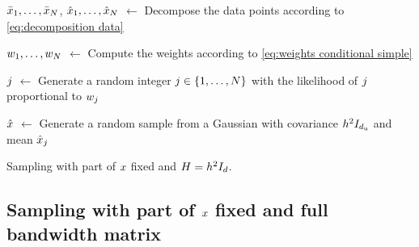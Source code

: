 \begin{algorithm}[t]
	
	$\bar{x}_{1},\ldots,\bar{x}_{N}$, $\hat{x}_{1},\ldots,\hat{x}_{N}$ $\gets$ Decompose the data points according to \cref{eq:decomposition data}
	
	$w_{1},\ldots,w_{N}$ $\gets$ Compute the weights according to \cref{eq:weights conditional simple}
	
	$j$ $\gets$ Generate a random integer $j\in\{1,\ldots,N\}$ with the likelihood of $j$ proportional to $w_{j}$
	
	$\hat{x}$ $\gets$ Generate a random sample from a Gaussian with covariance $h^2 I_{d_\mathrm{u}}$ and mean $\hat{x}_{j}$
		
	\caption{Sampling with part of $x$ fixed and $H=h^2 I_{d}$.}
	\label{alg:conditional simple}
\end{algorithm}



\subsection{Sampling with part of $x$ fixed and full bandwidth matrix}
\label{sec:sampling conditional hard}

